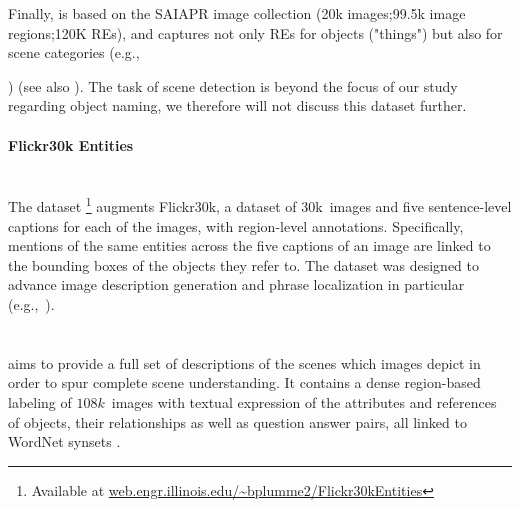 Finally,  is based on the SAIAPR image collection \cite{Grubinger2006} (20k images;99.5k image regions;120K REs), and captures not only REs for objects ("things") but also for scene categories (e.g.,{) (see also \cite{hu2015,mao2016generation}). 
The task of scene detection is beyond the focus of our study regarding object naming, we therefore will not discuss this dataset further.

\paragraph{Flickr30k Entities}~\\
The \flickr dataset \cite{plummer2015flickr30kentities}\footnote{Available at  \url{web.engr.illinois.edu/~bplumme2/Flickr30kEntities}}  augments Flickr30k, a dataset of 30k~images and five sentence-level captions for each of the images, with region-level annotations. 
Specifically, mentions of the same entities across the five captions of an image are linked to the bounding boxes of the objects they refer to. 
The dataset was designed to advance image description generation and phrase localization in particular (e.g.,~\cite{rohrbach2016grounding,plummer2017phrase,yeh2018unsupervised}). 
%
%

\paragraph{\vgenome}~\\
\vgenome \cite{krishna2016visualgenome} aims to provide a full set of descriptions of the scenes which images depict in order to spur complete scene understanding. 
It contains a dense region-based labeling of $108k$~images with textual expression of the attributes and references of objects, their relationships as well as question answer pairs, all linked to WordNet synsets \cite[see below]{fellbaum1998wordnet}. 

\iffalse 
5.4 Million Region Descriptions
1.7 Million Visual Question Answers
3.8 Million Object Instances
2.8 Million Attributes
2.3 Million Relationships
Everything Mapped to Wordnet Synsets
\fi

}
